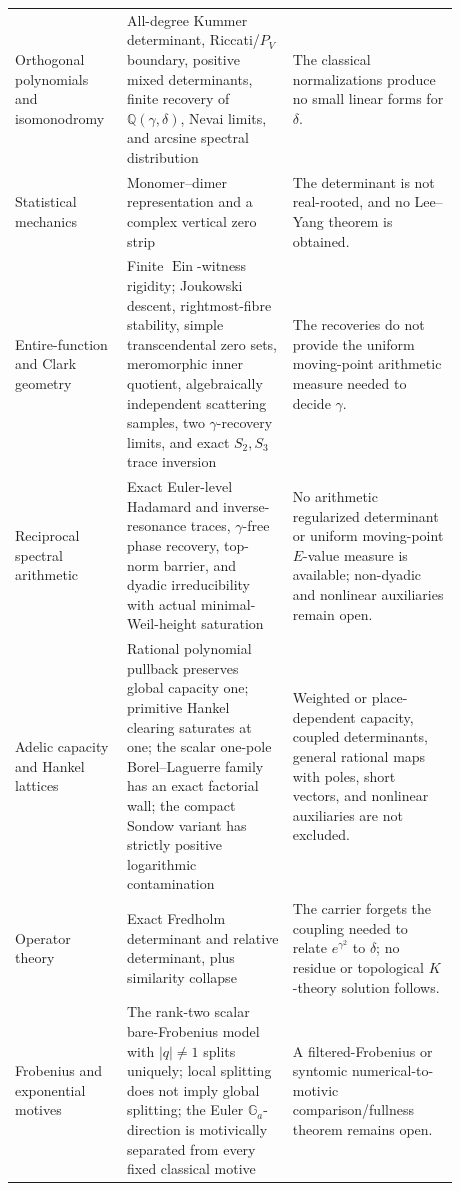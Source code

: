 \documentclass[11pt]{article}
\theoremstyle{definition}
\theoremstyle{remark}
\newcommand{\Q}{\mathbb Q}
\newcommand{\Ein}{\operatorname{Ein}}
\begin{document}
\begin{longtable}{>{\raggedright\arraybackslash}p{0.20\linewidth}
                >{\raggedright\arraybackslash}p{0.34\linewidth}
                >{\raggedright\arraybackslash}p{0.34\linewidth}}
Orthogonal polynomials and isomonodromy & All-degree Kummer determinant,
Riccati/\(P_V\) boundary, positive mixed determinants, finite recovery of
\(\Q(\gamma,\delta)\), Nevai limits, and arcsine spectral distribution & The
classical normalizations produce no small linear forms for \(\delta\). \\

Statistical mechanics & Monomer--dimer representation and a complex vertical
zero strip & The determinant is not real-rooted, and no Lee--Yang theorem is
obtained. \\

Entire-function and Clark geometry & Finite \(\Ein\)-witness rigidity;
Joukowski descent, rightmost-fibre stability, simple transcendental zero
sets, meromorphic inner quotient, algebraically independent scattering
samples, two \(\gamma\)-recovery limits, and exact \(S_2,S_3\) trace
inversion & The recoveries do not provide the uniform moving-point
arithmetic measure needed to decide \(\gamma\). \\

Reciprocal spectral arithmetic & Exact Euler-level Hadamard and
inverse-resonance traces, \(\gamma\)-free phase recovery, top-norm barrier, and
dyadic irreducibility with actual minimal-Weil-height saturation & No
arithmetic regularized determinant or uniform moving-point \(E\)-value
measure is available; non-dyadic and nonlinear auxiliaries remain open. \\

Adelic capacity and Hankel lattices & Rational polynomial pullback preserves
global capacity one; primitive Hankel clearing saturates at one; the scalar
one-pole Borel--Laguerre family has an exact factorial wall; the compact
Sondow variant has strictly positive logarithmic contamination & Weighted or
place-dependent capacity, coupled determinants, general rational maps with
poles, short vectors, and nonlinear auxiliaries are not excluded. \\

Operator theory & Exact Fredholm determinant and relative determinant, plus
similarity collapse & The carrier forgets the coupling needed to relate
\(e^{\gamma^2}\) to \(\delta\); no residue or topological \(K\)-theory
solution follows. \\

Frobenius and exponential motives & The rank-two scalar bare-Frobenius model
with \(|q|\ne1\) splits uniquely; local splitting does not imply global
splitting; the Euler
\(\mathbb G_a\)-direction is motivically separated from every fixed classical
motive & A filtered-Frobenius or syntomic numerical-to-motivic
comparison/fullness theorem remains open. \\
\end{longtable}
\endgroup
\end{document}
